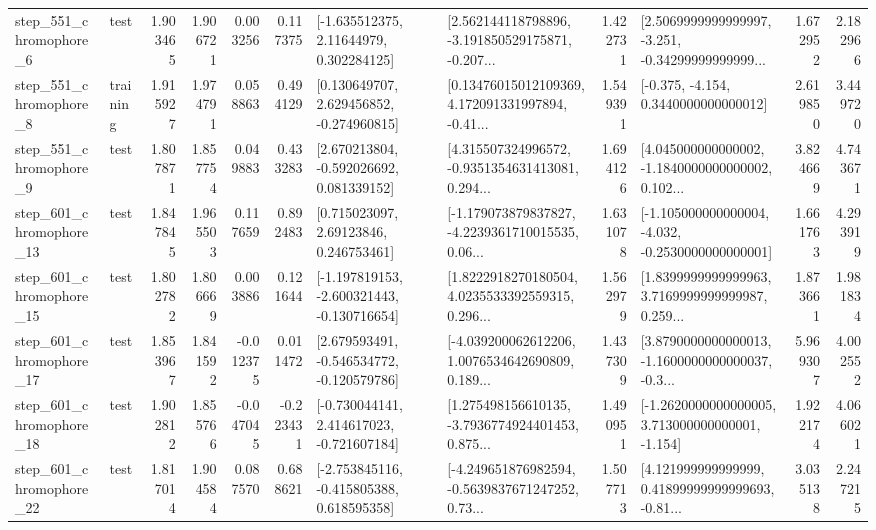 \begin{tabular}{llrrrrllrlrr}
   step\_551\_chromophore\_6 &      test &      1.903465 &    1.906721 &      0.003256 &  0.117375 &     [-1.635512375, 2.11644979, 0.302284125] &  [2.562144118798896, -3.191850529175871, -0.207... &       1.422731 &  [2.5069999999999997, -3.251, -0.34299999999999... &            1.672952 &          2.182966 \\
   step\_551\_chromophore\_8 &  training &      1.915927 &    1.974791 &      0.058863 &  0.494129 &    [0.130649707, 2.629456852, -0.274960815] &  [0.13476015012109369, 4.172091331997894, -0.41... &       1.549391 &               [-0.375, -4.154, 0.3440000000000012] &            2.619850 &          3.449720 \\
   step\_551\_chromophore\_9 &      test &      1.807871 &    1.857754 &      0.049883 &  0.433283 &    [2.670213804, -0.592026692, 0.081339152] &  [4.315507324996572, -0.9351354631413081, 0.294... &       1.694126 &  [4.045000000000002, -1.1840000000000002, 0.102... &            3.824669 &          4.743671 \\
  step\_601\_chromophore\_13 &      test &      1.847845 &    1.965503 &      0.117659 &  0.892483 &      [0.715023097, 2.69123846, 0.246753461] &  [-1.179073879837827, -4.2239361710015535, 0.06... &       1.631078 &  [-1.105000000000004, -4.032, -0.2530000000000001] &            1.661763 &          4.293919 \\
  step\_601\_chromophore\_15 &      test &      1.802782 &    1.806669 &      0.003886 &  0.121644 &  [-1.197819153, -2.600321443, -0.130716654] &  [1.8222918270180504, 4.0235533392559315, 0.296... &       1.562979 &  [1.8399999999999963, 3.7169999999999987, 0.259... &            1.873661 &          1.981834 \\
  step\_601\_chromophore\_17 &      test &      1.853967 &    1.841592 &     -0.012375 &  0.011472 &   [2.679593491, -0.546534772, -0.120579786] &  [-4.039200062612206, 1.0076534642690809, 0.189... &       1.437309 &  [3.8790000000000013, -1.1600000000000037, -0.3... &            5.969307 &          4.002552 \\
  step\_601\_chromophore\_18 &      test &      1.902812 &    1.855766 &     -0.047045 & -0.223431 &   [-0.730044141, 2.414617023, -0.721607184] &  [1.275498156610135, -3.7936774924401453, 0.875... &       1.490951 &   [-1.2620000000000005, 3.713000000000001, -1.154] &            1.922174 &          4.066021 \\
  step\_601\_chromophore\_22 &      test &      1.817014 &    1.904584 &      0.087570 &  0.688621 &   [-2.753845116, -0.415805388, 0.618595358] &  [-4.249651876982594, -0.5639837671247252, 0.73... &       1.507713 &  [4.121999999999999, 0.41899999999999693, -0.81... &            3.035138 &          2.247215 \\

\end{tabular}
